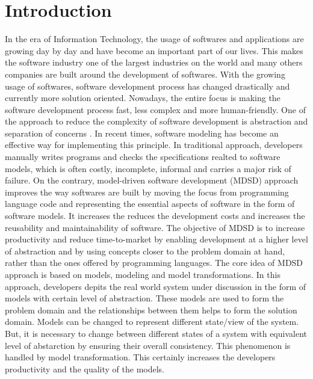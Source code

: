 \section{Introduction}\label{sec:introduction}
In the era of Information Technology, the usage of softwares and applications are growing day by day and have become an important part of our lives. This makes the software industry one of the largest industries on the world and many others companies are built around the development of softwares. With the growing usage of softwares, software development process has changed drastically and currently more solution oriented. Nowadays, the entire focus is making the software development process fast, less complex and more human-friendly. 
\newline\newline One of the approach to reduce the complexity of software development is abstraction and separation of concerns \cite{modeltransform}. In recent times, software modeling has become an effective way for implementing this principle. In traditional approach, developers manually writes programs and checks the specifications realted to software models, which is often costly, incomplete, informal and carries a major risk of failure. On the contrary, model-driven software development (MDSD) approach improves the way softwares are built by moving the focus from programming language code and representing the essential aspects of software in the form of software models. It increases the reduces the development costs and increases the reusability and maintainability of software. The objective of MDSD \cite{modeltransform} is to increase productivity and reduce time-to-market by enabling development at a higher level of abstraction and by using concepts closer to the problem domain at hand, rather than the ones offered by programming languages. 
\newline\newline The core idea of MDSD approach is based on models, modeling and model transformations. In this approach, developers depits the real world system under discussion in the form of models with certain level of abstraction. These models are used to form the problem domain and the relationships between them helps to form the solution domain. Models can be changed to represent different state/view of the system. But, it is necessary to change between different states of a system with equivalent level of abstarction by ensuring their overall consistency. This phenomenon is handled by model transformation. This certainly increases the developers productivity and the quality of the models.

